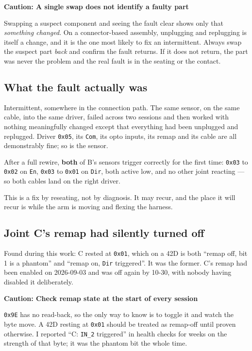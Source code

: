 \documentclass[11pt,letterpaper]{article}
\newenvironment{caution}[1]{%
    \par\addvspace{8pt}%
    \noindent{\color{cautionred}\rule{\linewidth}{0.8pt}}\par\vspace{2pt}
    \noindent\textbf{\color{cautionred}Caution: #1}\par\vspace{2pt}
}{%
    \par\vspace{2pt}\noindent{\color{cautionred}\rule{\linewidth}{0.4pt}}%
    \par\addvspace{8pt}%
}
\begin{document}
\begin{caution}{A single swap does not identify a faulty part}
Swapping a suspect component and seeing the fault clear shows only that
\emph{something changed}. On a connector-based assembly, unplugging and
replugging is itself a change, and it is the one most likely to fix an
intermittent. Always swap the suspect part \emph{back} and confirm the fault
returns. If it does not return, the part was never the problem and the real
fault is in the seating or the contact.
\end{caution}

\subsection{What the fault actually was}
Intermittent, somewhere in the connection path. The same sensor, on the same
cable, into the same driver, failed across two sessions and then worked with
nothing meaningfully changed except that everything had been unplugged and
replugged. Driver \texttt{0x05}, its \texttt{Com}, its opto inputs, its remap
and its cable are all demonstrably fine; so is the sensor.

After a full rewire, \textbf{both} of B's sensors trigger correctly for the
first time: \texttt{0x03} to \texttt{0x02} on \texttt{En}, \texttt{0x03} to
\texttt{0x01} on \texttt{Dir}, both active low, and no other joint reacting ---
so both cables land on the right driver.

This is a fix by reseating, not by diagnosis. It may recur, and the place it
will recur is while the arm is moving and flexing the harness.

\subsection{Joint C's remap had silently turned off}
Found during this work: C rested at \texttt{0x01}, which on a 42D is both ``remap
off, bit 1 is a phantom'' and ``remap on, \texttt{Dir} triggered''. It was the
former. C's remap had been enabled on 2026-09-03 and was off again by 10-30,
with nobody having disabled it deliberately.

\begin{caution}{Check remap state at the start of every session}
\texttt{0x9E} has no read-back, so the only way to know is to toggle it and watch
the byte move. A 42D resting at \texttt{0x01} should be treated as remap-off
until proven otherwise. I reported ``C: \texttt{IN\_2} triggered'' in health
checks for weeks on the strength of that byte; it was the phantom bit the whole
time.
\end{caution}
\end{document}
